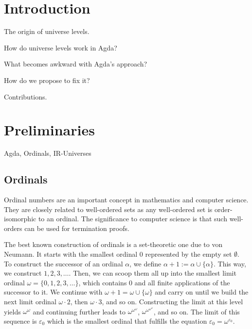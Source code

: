 \documentclass[manuscript,screen,review,anonymous]{acmart}
\begin{document}
\maketitle

\section{Introduction}
\label{sec:introduction}

The origin of universe levels.

How do universe levels work in Agda?

What becomes awkward with Agda's approach?

How do we propose to fix it?

Contributions.


\section{Preliminaries}
\label{sec:preliminaries}

Agda, Ordinals, IR-Universes

\subsection{Ordinals}
\label{sec:ordinals}

Ordinal numbers are an important concept in mathematics and computer
science. They are closely related to well-ordered sets as any
well-ordered set is order-isomorphic to an ordinal. The significance
to computer science is that such well-orders can be used for
termination proofs.

The best known construction of ordinals is a set-theoretic one due to
von Neumann. It starts with the smallest ordinal $0$ represented by
the empty set $\emptyset$. To construct the successor of an ordinal
$\alpha$, we define $\alpha+1  := \alpha \cup \{ \alpha \}$. This way,
we construct $1, 2, 3, \dots$. Then, we can scoop them all up into the
smallest limit ordinal $\omega = \{ 0, 1, 2, 3, \dots \}$, which
contains $0$ and all finite applications of the successor to it. We
continue with $\omega + 1 = \omega \cup \{ \omega \}$ and carry on
until we build the next limit ordinal $\omega \cdot 2$, then $\omega
\cdot 3$, and so on. Constructing the limit at this level yields
$\omega^\omega$ and continuing further leads to
$\omega^{\omega^\omega}$, $\omega^{\omega^{\omega^\omega}}$, and so
on. The limit of this sequence is $\varepsilon_0$ which is the
smallest ordinal that fulfills the equation
$\varepsilon_0 = \omega^{\varepsilon_0}$.
\end{document}
